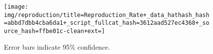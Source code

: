 \begin{figure*}[!htbp]
\begin{center}

\texttt{[image: img/reproduction/title=Reproduction\_Rate+\_data\_hathash\_hash=abbd7dbb4cba6da1+\_script\_fullcat\_hash=3612aad527ec4368+\_source\_hash=ffbe01c-clean+ext=]}

\caption{
Error bars indicate 95\% confidence.
}
\label{fig:reproduction}
\end{center}
\end{figure*}
